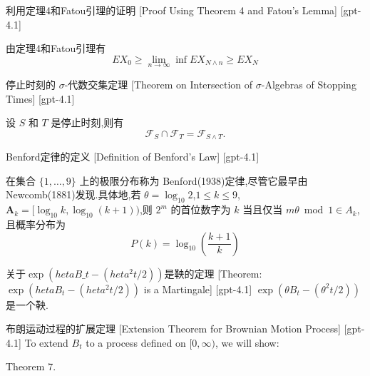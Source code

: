 \documentclass[UTF8]{ctexart}
\begin{document}
    
    
    \begin{prf}
        {利用定理4和Fatou引理的证明}
        [Proof Using Theorem 4 and Fatou's Lemma]
        [gpt-4.1]
        
由定理4和Fatou引理有
\[
E X_{0} \geq \lim_{n \to \infty} \inf E X_{N \wedge n} \geq E X_{N}
\]

    \end{prf}
    
    
    
    \begin{thm}
        {停止时刻的 $\sigma$-代数交集定理}
        [Theorem on Intersection of $\sigma$-Algebras of Stopping Times]
        [gpt-4.1]
        
设 $S$ 和 $T$ 是停止时刻,则有
\[
\mathcal{F}_S \cap \mathcal{F}_T = \mathcal{F}_{S \wedge T} .
\]

    \end{thm}
    
    
    
    \begin{dfn}
        {Benford定律的定义}
        [Definition of Benford's Law]
        [gpt-4.1]
        
在集合 $\{1, \ldots, 9\}$ 上的极限分布称为 Benford(1938)定律,尽管它最早由 Newcomb(1881)发现.具体地,若 $\theta = \log_{10} 2$,$1 \leq k \leq 9$,$\boldsymbol{A}_{k} = [\log_{10} k, \log_{10} (k+1))$,则 $2^m$ 的首位数字为 $k$ 当且仅当 $m\theta \bmod 1 \in A_k$,且概率分布为
\[
P(k) = \log_{10} \left( \frac{k+1}{k} \right)
\]

    \end{dfn}
    
    
    
    \begin{thm}
        {关于$\exp(	heta B\_{t} - (	heta^{2} t / 2))$是鞅的定理}
        [Theorem: $\exp(	heta B_{t} - (	heta^{2} t / 2))$ is a Martingale]
        [gpt-4.1]
        $\exp(\theta B_{t} - (\theta^{2} t / 2))$ 是一个鞅.

    \end{thm}
    
    
    
    \begin{thm}
        {布朗运动过程的扩展定理}
        [Extension Theorem for Brownian Motion Process]
        [gpt-4.1]
        To extend $B_t$ to a process defined on $[0, \infty)$, we will show:

Theorem 7.
    \end{thm}
    
\end{document}

